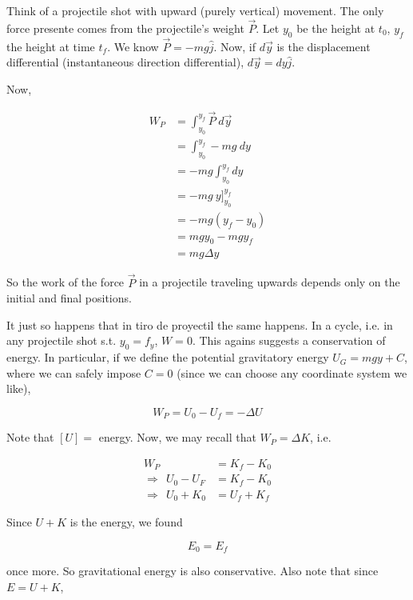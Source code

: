 \documentclass[12pt]{article}
\theoremstyle{definition}
\begin{document}
Think of a projectile shot with upward (purely vertical) movement. The only
force presente comes from the projectile's weight $\vec{P}$. Let $y_0$ be the
height at $t_0$, $y_f$ the height at time $t_f$. We know $\vec{P} = -mg
\hat{j}$. Now, if $d\vec{y}$ is the displacement differential (instantaneous
direction differential), $d\vec{y} = dy \hat{j}$.

Now, 

\begin{align*}
    W_P 
    &= \int_{y_0}^{y_f} \vec{P} ~ d \vec{y} \\ 
    &= \int_{y_0}^{y_f} -mg ~ dy \\ 
    &= -mg \int_{y_0}^{y_f} dy \\ 
    &= -mg ~ y\Big]_{y_0}^{y_f} \\ 
    &= -mg \left( y_f - y_0 \right)  \\ 
    &= mgy_0 - mgy_f \\ 
    &= mg \Delta y
\end{align*}

So the work of the force $\vec{P}$ in a projectile traveling upwards depends
only on the initial and final positions.

It just so happens that in tiro de proyectil the same happens. In a cycle, i.e.
in any projectile shot s.t. $y_0 = f_y$, $W = 0$. This agains suggests a
conservation of energy. In particular, if we define the potential gravitatory
energy $U_G = mg y + C$, where we can safely impose $C = 0$ (since we can choose
any coordinate system we like), 

\begin{equation*}
    W_P = U_0 - U_f = -\Delta U
\end{equation*}

Note that $\left[ U \right] = $ energy. Now, we may recall that $W_P = \Delta
K$, i.e. 

\begin{align*}
    W_P 
    &= K_f - K_0  \\ 
   \Rightarrow ~ ~ U_0 - U_F &= K_f - K_0 \\ 
   \Rightarrow ~ ~ U_0 + K_0 &= U_f + K_f
\end{align*}

Since $U + K$ is the energy, we found 

\begin{equation}
    E_0 = E_f
\end{equation}

once more. So gravitational energy is also conservative. Also note that since $E
= U + K$,
\end{document}
